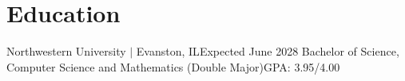 \section{Education}
  \resumeSubHeadingListStart
    \resumeSubheading
      {Northwestern University\normalfont{} $|$ Evanston, IL}{Expected June 2028}
      {Bachelor of Science, Computer Science and Mathematics (Double Major)}{\normalfont GPA: 3.95/4.00}
      \resumeItemListStart
      \resumeItemListEnd
  \resumeSubHeadingListEnd
